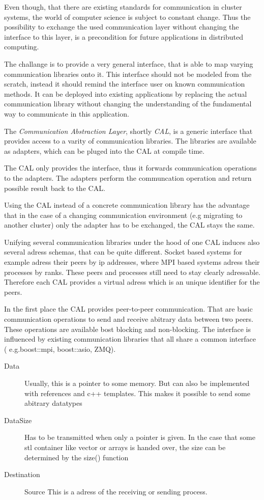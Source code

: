 Even though, that there are existing standards for communication in
cluster systems, the world of computer science is subject to constant
change. Thus the possibility to exchange the used communication layer
without changing the interface to this layer, is a precondition for
future applications in distributed computing.

The challange is to provide a very general interface, that is able to
map varying communication libraries onto it. This interface should not
be modeled from the scratch, instead it should remind the interface
user on known communication methods. It can be deployed into existing
applications by replacing the actual communication library without
changing the understanding of the fundamental way to communicate in
this application.

The \textit{Communication Abstraction Layer}, shortly \textit{CAL}, is
a generic interface that provides access to a varity of communication
libraries. The libraries are available as adapters, which can be
pluged into the CAL at compile time.

The CAL only provides the interface, thus it forwards communication
operations to the adapters.  The adapters perform the communcation
operation and return possible result back to the CAL. 

Using the CAL instead of a concrete communication library has the
advantage that in the case of a changing communication environment
(e.g migrating to another cluster) only the adapter has to be
exchanged, the CAL stays the same.

Unifying several communication libraries under the hood of one CAL
induces also several adress schemas, that can be quite different.
Socket based systems for example adress their peers by ip addresses,
where MPI based systems adress their processes by ranks. These peers
and processes still need to stay clearly adressable. Therefore each
CAL provides a virtual adress which is an unique identifier for the
peers.

In the first place the CAL provides peer-to-peer communication. That
are basic communication operations to send and receive abitrary data
between two peers. These operations are available
bost blocking and non-blocking. The interface is influenced by
existing communication libraries that all share a common interface (
e.g.boost::mpi, boost::asio, ZMQ).

\begin{description}
  \item[Data] Usually, this is a pointer to some memory.  But can
    also be implemented with references and c++ templates.  This makes
    it possible to send some abitrary datatypes
  \item[DataSize] Has to be transmitted when only a pointer is
    given. In the case that some stl container like vector or arrays
    is handed over, the size can be determined by the size() function
  \item[Destination]  Source This is a adress of the receiving or
    sending process.
    
\end{description}

